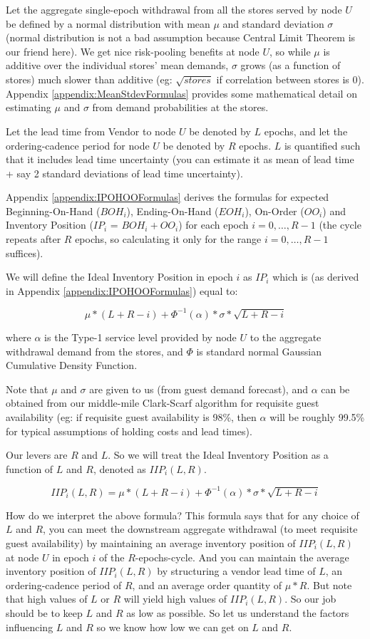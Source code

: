 \documentclass[11pt]{amsart}
\begin{document}
Let the aggregate single-epoch withdrawal from all the stores served by node $U$ be defined by a normal distribution with mean $\mu$ and standard deviation $\sigma$ (normal distribution is not a bad assumption because Central Limit Theorem is our friend here). We get nice risk-pooling benefits at node $U$, so while $\mu$ is additive over the individual stores' mean demands, $\sigma$ grows (as a function of stores) much slower than additive (eg: $\sqrt{stores}$ if correlation between stores is 0). Appendix \ref{appendix:MeanStdevFormulas} provides some mathematical detail on estimating $\mu$ and $\sigma$ from demand probabilities at the stores.
 
Let the lead time from Vendor to node $U$ be denoted by $L$ epochs, and let the ordering-cadence period for node $U$ be denoted by $R$ epochs. $L$ is quantified such that it includes lead time uncertainty (you can estimate it as mean of lead time + say 2 standard deviations of lead time uncertainty).
 
Appendix \ref{appendix:IPOHOOFormulas} derives the formulas for expected Beginning-On-Hand ($BOH_i$), Ending-On-Hand ($EOH_i$), On-Order ($OO_i$) and Inventory Position ($IP_i$ = $BOH_i + OO_i$) for each epoch $i = 0, \ldots, R - 1$ (the cycle repeats after $R$ epochs, so calculating it only for the range $i = 0, \ldots, R - 1$ suffices).

We will define the Ideal Inventory Position in epoch $i$ as $IP_i$ which is (as derived in Appendix \ref{appendix:IPOHOOFormulas}) equal to:
 
$$\mu * (L + R - i) + \Phi^{-1}(\alpha) * \sigma * \sqrt{L+R-i}$$

where $\alpha$ is the Type-1 service level provided by node $U$ to the aggregate withdrawal demand from the stores, and $\Phi$ is standard normal Gaussian Cumulative Density Function.
 
Note that $\mu$ and $\sigma$ are given to us (from guest demand forecast), and $\alpha$ can be obtained from our middle-mile Clark-Scarf algorithm for requisite guest availability (eg: if requisite guest availability is 98\%, then $\alpha$ will be roughly 99.5\% for typical assumptions of holding costs and lead times). 

Our levers are $R$ and $L$. So we will treat the Ideal Inventory Position as a function of $L$ and $R$, denoted as $IIP_i(L, R)$.

$$IIP_i(L, R) = \mu * (L + R - i) + \Phi^{-1}(\alpha) * \sigma * \sqrt{L+R-i}$$

How do we interpret the above formula? This formula says that for any choice of $L$ and $R$, you can meet the downstream aggregate withdrawal (to meet requisite guest availability) by maintaining an average inventory position of $IIP_i(L,R)$ at node $U$ in epoch $i$ of the $R$-epochs-cycle. And you can maintain the average inventory position of $IIP_i(L,R)$ by structuring a vendor lead time of $L$, an ordering-cadence period of $R$, and an average order quantity of $\mu * R$. But note that high values of $L$ or $R$ will yield high values of $IIP_i(L,R)$. So our job should be to keep $L$ and $R$ as low as possible. So let us understand the factors influencing $L$ and $R$ so we know how low we can get on $L$ and $R$.
\end{document}
